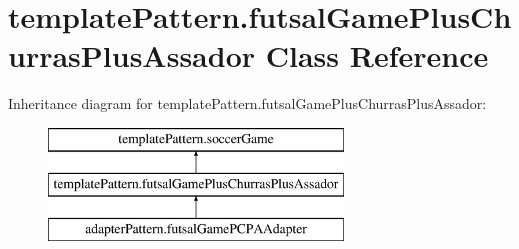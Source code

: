 \hypertarget{classtemplate_pattern_1_1futsal_game_plus_churras_plus_assador}{}\section{template\+Pattern.\+futsal\+Game\+Plus\+Churras\+Plus\+Assador Class Reference}
\label{classtemplate_pattern_1_1futsal_game_plus_churras_plus_assador}
Inheritance diagram for template\+Pattern.\+futsal\+Game\+Plus\+Churras\+Plus\+Assador\+:\begin{figure}[H]
\begin{center}
\leavevmode
\includegraphics[height=3.000000cm]{classtemplate_pattern_1_1futsal_game_plus_churras_plus_assador}
\end{center}
\end{figure}
